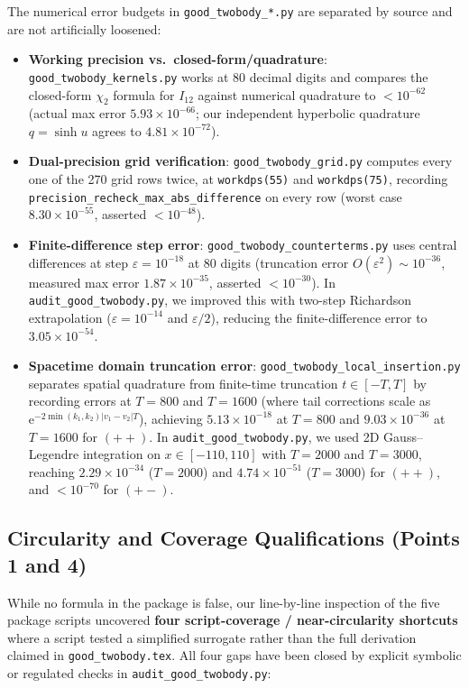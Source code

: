 \documentclass[11pt,a4paper]{article}
\newcommand{\ee}{\mathrm{e}}
\begin{document}
The numerical error budgets in \texttt{good\_twobody\_*.py} are separated by source and are not artificially loosened:
\begin{itemize}
\item \textbf{Working precision vs.\ closed-form/quadrature}: \texttt{good\_twobody\_kernels.py} works at 80 decimal digits and compares the closed-form $\chi_2$ formula for $I_{12}$ against numerical quadrature to $<10^{-62}$ (actual max error $5.93\times 10^{-66}$; our independent hyperbolic quadrature $q=\sinh u$ agrees to $4.81\times 10^{-72}$).
\item \textbf{Dual-precision grid verification}: \texttt{good\_twobody\_grid.py} computes every one of the 270 grid rows twice, at \texttt{workdps(55)} and \texttt{workdps(75)}, recording \texttt{precision\_recheck\_max\_abs\_difference} on every row (worst case $8.30\times 10^{-55}$, asserted $<10^{-48}$).
\item \textbf{Finite-difference step error}: \texttt{good\_twobody\_counterterms.py} uses central differences at step $\varepsilon = 10^{-18}$ at 80 digits (truncation error $O(\varepsilon^2) \sim 10^{-36}$, measured max error $1.87\times 10^{-35}$, asserted $<10^{-30}$). In \texttt{audit\_good\_twobody.py}, we improved this with two-step Richardson extrapolation ($\varepsilon = 10^{-14}$ and $\varepsilon/2$), reducing the finite-difference error to $3.05\times 10^{-54}$.
\item \textbf{Spacetime domain truncation error}: \texttt{good\_twobody\_local\_insertion.py} separates spatial quadrature from finite-time truncation $t \in [-T,T]$ by recording errors at $T=800$ and $T=1600$ (where tail corrections scale as $\ee^{-2\min(k_1,k_2)|v_1-v_2|T}$), achieving $5.13\times 10^{-18}$ at $T=800$ and $9.03\times 10^{-36}$ at $T=1600$ for $(++)$. In \texttt{audit\_good\_twobody.py}, we used 2D Gauss--Legendre integration on $x\in[-110,110]$ with $T=2000$ and $T=3000$, reaching $2.29\times 10^{-34}$ ($T=2000$) and $4.74\times 10^{-51}$ ($T=3000$) for $(++)$, and $<10^{-70}$ for $(+-)$.
\end{itemize}

\subsection{Circularity and Coverage Qualifications (Points 1 and 4)}

While no formula in the package is false, our line-by-line inspection of the five package scripts uncovered \textbf{four script-coverage / near-circularity shortcuts} where a script tested a simplified surrogate rather than the full derivation claimed in \texttt{good\_twobody.tex}. All four gaps have been closed by explicit symbolic or regulated checks in \texttt{audit\_good\_twobody.py}:
\end{document}
